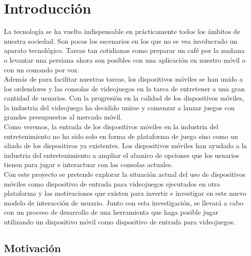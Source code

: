%
%




\chapter{Introducci\'on}

La tecnolog\'ia se ha vuelto indispensable en pr\'acticamente todos los \'ambitos de nuestra sociedad. Son pocos los escenarios  en los que no se vea involucrado un aparato tecnol\'ogico. Tareas tan cotidianas como preparar un caf\'e por la ma\~nana o levantar una persiana ahora son posibles con una aplicaci\'on en nuestro m\'ovil o con un comando por voz. \\

Adem\'as de para facilitar nuestras tareas, los dispositivos m\'oviles se han unido a los ordendores y las consolas de videojuegos en la tarea de entretener a una gran cantidad de usuarios. Con la progresi\'on en la calidad de los dispositivos m\'oviles, la industria del videojuego ha decidido unirse y comenzar a lanzar juegos con grandes presupuestos al mercado m\'ovil. \\

Como veremos, la entrada de los dispositivos m\'oviles en la industria del entretenimiento no ha sido solo en forma de plataforma de juego sino como un aliado de los dispositivos ya existentes. Los dispositivos m\'oviles han ayudado a la industria del entretenimiento a ampliar el abanico de opciones que los usuarios tienen para jugar e interactuar con las consolas actuales. \\


Con este proyecto se pretende explorar la situaci\'on actual del uso de dispositivos m\'oviles como dispositivo de entrada para videojuegos ejecutados en otra plataforma y las motivaciones que existen para invertir e investigar en este nuevo modelo de interacci\'on de usuario. Junto con esta investigaci\'on, se llevar\'a a cabo con un proceso de desarrollo de una herramienta que haga posible jugar utilizando un dispositivo m\'ovil como dispositivo de entrada para videojuegos.


\section{Motivaci\'on}

